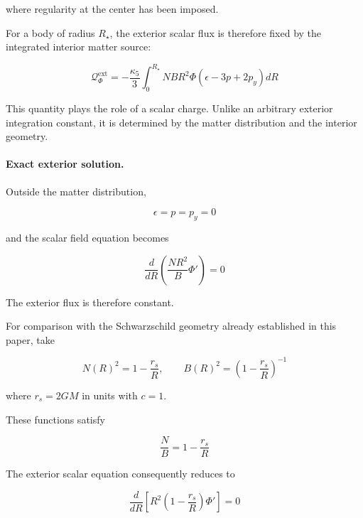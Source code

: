 \documentclass[pdflatex,sn-mathphys-num]{sn-jnl}%
\theoremstyle{thmstyleone}%
\theoremstyle{thmstyletwo}%
\theoremstyle{thmstylethree}%
\begin{document}
where regularity at the center has been imposed.

For a body of radius $R_\star$, the exterior scalar flux is therefore fixed by the integrated interior matter source:

\begin{equation}\label{eq_exterior_scalar_charge}
    \boxed{
    \mathcal Q_\Phi^{\mathrm{ext}}
    =
    -\frac{\kappa_5}{3}
    \int_0^{R_\star}
    NB R^2\Phi
    \left(
        \epsilon-3p+2p_y
    \right)dR
    }
\end{equation}

This quantity plays the role of a scalar charge. Unlike an arbitrary exterior integration constant, it is determined by the matter distribution and the interior geometry.

\paragraph{Exact exterior solution.}

Outside the matter distribution,

\begin{equation}
    \epsilon=p=p_y=0
\end{equation}

and the scalar field equation becomes

\begin{equation}
    \frac{d}{dR}
    \left(
        \frac{NR^2}{B}\Phi'
    \right)
    =
    0
\end{equation}

The exterior flux is therefore constant.

For comparison with the Schwarzschild geometry already established in this paper, take

\begin{equation}
    N(R)^2
    =
    1-\frac{r_s}{R},
    \qquad
    B(R)^2
    =
    \left(
        1-\frac{r_s}{R}
    \right)^{-1}
\end{equation}

where $r_s=2GM$ in units with $c=1$.

These functions satisfy

\begin{equation}
    \frac{N}{B}
    =
    1-\frac{r_s}{R}
\end{equation}

The exterior scalar equation consequently reduces to

\begin{equation}
    \frac{d}{dR}
    \left[
        R^2
        \left(
            1-\frac{r_s}{R}
        \right)
        \Phi'
    \right]
    =
    0
\end{equation}
\end{document}
